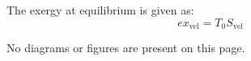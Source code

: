 The exergy at equilibrium is given as:  
\[
ex_{\text{vel}} = T_0 S_{\text{vel}}
\]  

No diagrams or figures are present on this page.